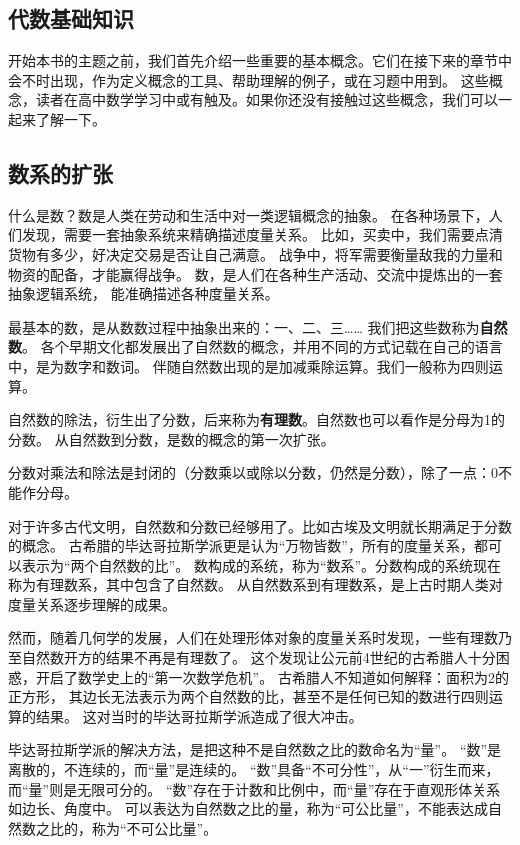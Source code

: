 \documentclass[12pt,UTF8,fontset=none]{ctexbook}
\begin{document}
\begin{appendix}

\chapter{代数基础知识}
开始本书的主题之前，我们首先介绍一些重要的基本概念。它们在接下来的章节中会不时出现，作为定义概念的工具、帮助理解的例子，或在习题中用到。
这些概念，读者在高中数学学习中或有触及。如果你还没有接触过这些概念，我们可以一起来了解一下。

\section{数系的扩张}
什么是数？数是人类在劳动和生活中对一类逻辑概念的抽象。
在各种场景下，人们发现，需要一套抽象系统来精确描述度量关系。
比如，买卖中，我们需要点清货物有多少，好决定交易是否让自己满意。
战争中，将军需要衡量敌我的力量和物资的配备，才能赢得战争。
数，是人们在各种生产活动、交流中提炼出的一套抽象逻辑系统，
能准确描述各种度量关系。

最基本的数，是从数数过程中抽象出来的：一、二、三…… 我们把这些数称为\textbf{自然数}。
各个早期文化都发展出了自然数的概念，并用不同的方式记载在自己的语言中，是为数字和数词。
伴随自然数出现的是加减乘除运算。我们一般称为四则运算。

自然数的除法，衍生出了分数，后来称为\textbf{有理数}。自然数也可以看作是分母为1的分数。
从自然数到分数，是数的概念的第一次扩张。

分数对乘法和除法是封闭的（分数乘以或除以分数，仍然是分数），除了一点：0不能作分母。

对于许多古代文明，自然数和分数已经够用了。比如古埃及文明就长期满足于分数的概念。
古希腊的毕达哥拉斯学派更是认为“万物皆数”，所有的度量关系，都可以表示为“两个自然数的比”。
数构成的系统，称为“数系”。分数构成的系统现在称为有理数系，其中包含了自然数。
从自然数系到有理数系，是上古时期人类对度量关系逐步理解的成果。

然而，随着几何学的发展，人们在处理形体对象的度量关系时发现，一些有理数乃至自然数开方的结果不再是有理数了。
这个发现让公元前4世纪的古希腊人十分困惑，开启了数学史上的“第一次数学危机”。
古希腊人不知道如何解释：面积为2的正方形，
其边长无法表示为两个自然数的比，甚至不是任何已知的数进行四则运算的结果。
这对当时的毕达哥拉斯学派造成了很大冲击。

毕达哥拉斯学派的解决方法，是把这种不是自然数之比的数命名为“量”。
“数”是离散的，不连续的，而“量”是连续的。
“数”具备“不可分性”，从“一”衍生而来，而“量”则是无限可分的。
“数”存在于计数和比例中，而“量”存在于直观形体关系如边长、角度中。
可以表达为自然数之比的量，称为“可公比量”，不能表达成自然数之比的，称为“不可公比量”。


\end{appendix}
\end{document}
